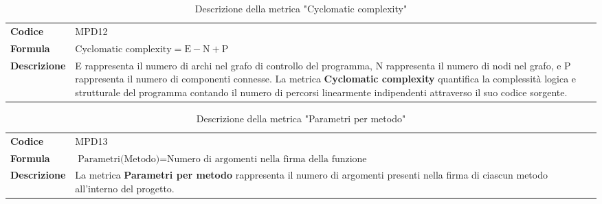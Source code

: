 \documentclass[a4paper,12pt]{article}
\begin{document}
        {\renewcommand{\arraystretch}{1.4}
            \begin{table}[H]
            \centering
            \begin{tabularx}{\textwidth}{|l|X|}
                \hline
                \rowcolor{gold}
                \multicolumn{2}{|c|}{\textbf{Cyclomatic complexity}}\\
                \hline
                \textbf{Codice} & MPD12 \\
                \hline
                \textbf{Formula} & \( \displaystyle \text{Cyclomatic complexity} = \text{E}-\text{N}+\text{P} \)\\
                \hline
                \textbf{Descrizione} & E rappresenta il numero di archi nel grafo di controllo del programma, N rappresenta il numero di nodi nel grafo, e P rappresenta il numero di componenti connesse. La metrica \textbf{Cyclomatic complexity} quantifica la complessità logica e strutturale del programma contando il numero di percorsi linearmente indipendenti attraverso il suo codice sorgente. \\
                \hline
            \end{tabularx}      
            \caption{Descrizione della metrica "Cyclomatic complexity"}
            \end{table}
        }

        {\renewcommand{\arraystretch}{1.4}
            \begin{table}[H]
            \centering
            \begin{tabularx}{\textwidth}{|l|X|}
                \hline
                \rowcolor{gold}
                \multicolumn{2}{|c|}{\textbf{Parametri per metodo}}\\
                \hline
                \textbf{Codice} & MPD13 \\
                \hline
                \textbf{Formula} & \( \displaystyle \text{Parametri(Metodo)} = \text{Numero di argomenti nella firma della funzione} \)\\
                \hline
                \textbf{Descrizione} & La metrica \textbf{Parametri per metodo} rappresenta il numero di argomenti presenti nella firma di ciascun metodo all'interno del progetto. \\
                \hline
            \end{tabularx}      
            \caption{Descrizione della metrica "Parametri per metodo"}
            \end{table}
        }
\end{document}
